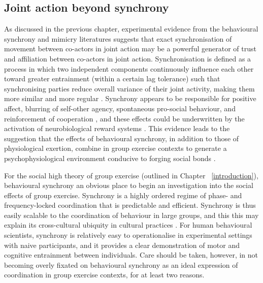 \begin{CJK}{UTF8}{gbsn}
\subsection{Joint action beyond synchrony}
As discussed in the previous chapter, experimental evidence from the behavioural synchrony and mimicry literatures suggests that exact synchronisation of movement between co-actors in joint action may be a powerful generator of trust and affiliation between co-actors in joint action.  Synchronisation is defined as a process in which two independent components continuously influence each other toward greater entrainment (within a certain lag tolerance) such that synchronising parties reduce overall variance of their joint activity, making them more similar and more regular \citep{Pikovsky2007}.  Synchrony appears to be responsible for positive affect, blurring of self-other agency, spontaneous pro-social behaviour, and reinforcement of cooperation \citep{Mogan2017}, and these effects could be underwritten by the activation of neurobiological reward systems \citep{Tarr2016}.  This evidence leads to the suggestion that the effects of behavioural synchrony, in addition to those of physiological exertion, combine in group exercise contexts to generate a psychophysiological environment conducive to forging social bonds \citep{Cohen2017}.

For the social high theory of group exercise (outlined in Chapter ~\ref{introduction}), behavioural synchrony an obvious place to begin an investigation into the social effects of group exercise.  Synchrony is a highly ordered regime of phase- and frequency-locked coordination that is predictable and efficient. Synchrony is thus easily scalable to the coordination of behaviour in large groups, and this this may explain its cross-cultural ubiquity in cultural practices \citep{Dunbar2010,Tarr2016}.  For human behavioural scientists, synchrony is relatively easy to operationalise in experimental settings with naive participants, and it provides a clear demonstration of motor and cognitive entrainment between individuals.  Care should be taken, however, in not becoming overly fixated on behavioural synchrony as an ideal expression of coordination in group exercise contexts, for at least two reasons.


\end{CJK}
